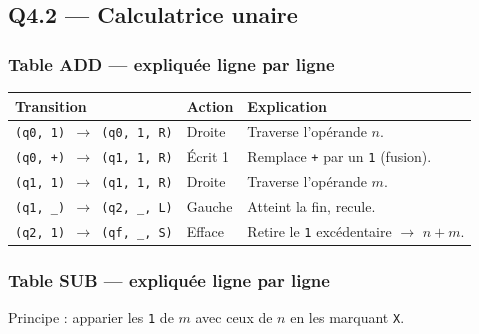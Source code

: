 \documentclass[12pt,a4paper,oneside]{scrartcl}
\begin{document}
\subsection{Q4.2 — Calculatrice unaire}

\subsubsection*{Table ADD — expliquée ligne par ligne}
\begin{center}
\begin{tabular}{llp{9cm}}
    \toprule
    \textbf{Transition} & \textbf{Action} & \textbf{Explication} \\
    \midrule
    \texttt{(q0, 1) $\to$ (q0, 1, R)} & Droite & Traverse l'opérande $n$. \\
    \texttt{(q0, +) $\to$ (q1, 1, R)} & Écrit 1 & Remplace \texttt{+} par un \texttt{1} (fusion). \\
    \texttt{(q1, 1) $\to$ (q1, 1, R)} & Droite & Traverse l'opérande $m$. \\
    \texttt{(q1, \_) $\to$ (q2, \_, L)} & Gauche & Atteint la fin, recule. \\
    \texttt{(q2, 1) $\to$ (qf, \_, S)} & Efface & Retire le \texttt{1} excédentaire $\to$ $n+m$. \\
    \bottomrule
\end{tabular}
\end{center}

\subsubsection*{Table SUB — expliquée ligne par ligne}

Principe : apparier les \texttt{1} de $m$ avec ceux de $n$ en les marquant \texttt{X}.

\begin{center}
\end{center}
\end{document}
